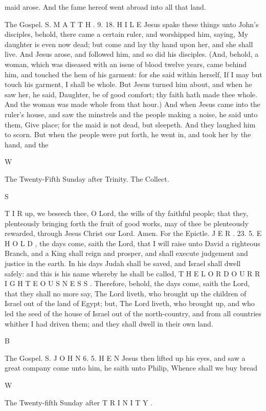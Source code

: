 maid arose. And the fame hereof went abroad into all that land.

The Gospel. S. M A T T H . 9. 18. H I L E Jesus spake these things unto John’s disciples, behold, there came a certain ruler, and worshipped him, saying, My daughter is even now dead; but come and lay thy hand upon her, and she shall live. And Jesus arose, and followed him, and so did his disciples. (And, behold, a woman, which was diseased with an issue of blood twelve years, came behind him, and touched the hem of his garment: for she said within herself, If I may but touch his garment, I shall be whole. But Jesus turned him about, and when he saw her, he said, Daughter, be of good comfort; thy faith hath made thee whole. And the woman was made whole from that hour.) And when Jesus came into the ruler’s house, and saw the minstrels and the people making a noise, he said unto them, Give place; for the maid is not dead, but sleepeth. And they laughed him to scorn. But when the people were put forth, he went in, and took her by the hand, and the

W

The Twenty-Fifth Sunday after Trinity. The Collect.

S

T I R up, we beseech thee, O Lord, the wills of thy faithful people; that they, plenteously bringing forth the fruit of good works, may of thee be plenteously rewarded, through Jesus Christ our Lord. Amen. For the Epictle. J E R . 23. 5. E H O L D , the days come, saith the Lord, that I will raise unto David a righteous Branch, and a King shall reign and prosper, and shall execute judgement and justice in the earth. In his days Judah shall be saved, and Israel shall dwell safely: and this is his name whereby he shall be called, T H E L O R D O U R R I G H T E O U S N E S S . Therefore, behold, the days come, saith the Lord, that they shall no more say, The Lord liveth, who brought up the children of Israel out of the land of Egypt; but, The Lord liveth, who brought up, and who led the seed of the house of Israel out of the north-country, and from all countries whither I had driven them; and they shall dwell in their own land.

B

The Gospel. S. J O H N 6. 5. H E N Jesus then lifted up his eyes, and saw a great company come unto him, he saith unto Philip, Whence shall we buy bread

W

The Twenty-fifth Sunday after T R I N I T Y .


